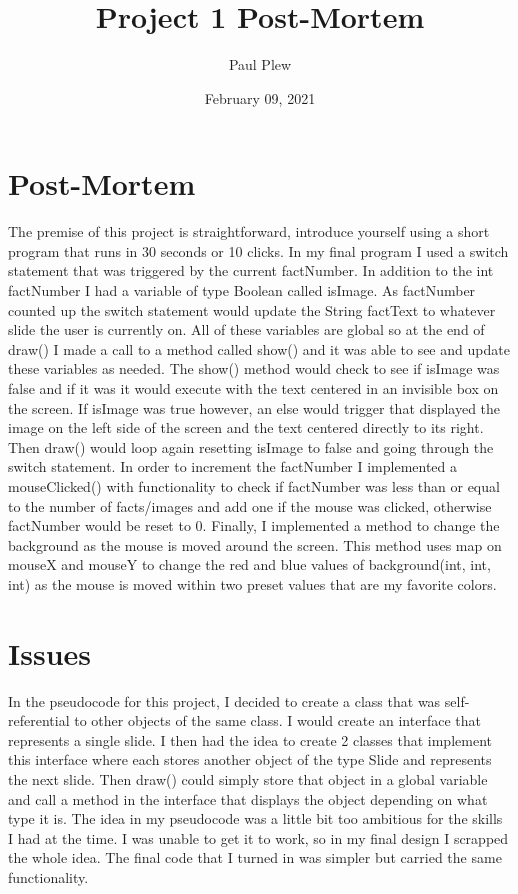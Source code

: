 \documentclass[12 pt]{report}
\title{Project 1 Post-Mortem}
\author{Paul Plew}
\date{February 09, 2021}
\begin{document}
\maketitle

\section{Post-Mortem}
\hspace{\parindent} The premise of this project is straightforward, introduce yourself using a short program that runs in 30 seconds or 10 clicks. In my final program I used a switch statement that was triggered by the current factNumber. In addition to the int factNumber I had a variable of type Boolean called isImage. As factNumber counted up the switch statement would update the String factText to whatever slide the user is currently on. All of these variables are global so at the end of draw() I made a call to a method called show() and it was able to see and update these variables as needed. The show() method would check to see if isImage was false and if it was it would execute with the text centered in an invisible box on the screen. If isImage was true however, an else would trigger that displayed the image on the left side of the screen and the text centered directly to its right. Then draw() would loop again resetting isImage to false and going through the switch statement. In order to increment the factNumber I implemented a mouseClicked() with functionality to check if factNumber was less than or equal to the number of facts/images and add one if the mouse was clicked, otherwise factNumber would be reset to 0. Finally, I implemented a method to change the background as the mouse is moved around the screen. This method uses map on mouseX and mouseY to change the red and blue values of background(int, int, int) as the mouse is moved within two preset values that are my favorite colors. 
\section{Issues}
\hspace{\parindent} In the pseudocode for this project, I decided to create a class that was self-referential to other objects of the same class. I would create an interface that represents a single slide. I then had the idea to create 2 classes that implement this interface where each stores another object of the type Slide and represents the next slide. Then draw() could simply store that object in a global variable and call a method in the interface that displays the object depending on what type it is. The idea in my pseudocode was a little bit too ambitious for the skills I had at the time. I was unable to get it to work, so in my final design I scrapped the whole idea. The final code that I turned in was simpler but carried the same functionality. 
\end{document}
